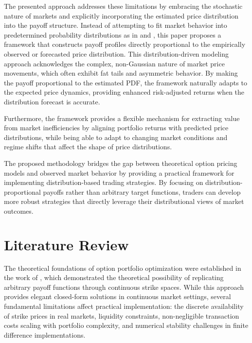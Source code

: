 \documentclass[12pt]{article}
\begin{document}
The presented approach addresses these limitations by embracing the stochastic nature of markets
and explicitly incorporating the estimated price distribution into the payoff structure. Instead 
of attempting to fit market behavior into predetermined probability distributions as in 
\citep{Kuang2023} and \citep{Li2023}, this paper proposes a framework that constructs payoff 
profiles directly proportional to the empirically observed or forecasted price distribution. 
This distribution-driven modeling approach acknowledges the complex, non-Gaussian nature of 
market price movements, which often exhibit fat tails and asymmetric behavior. By making the 
payoff proportional to the estimated PDF, the framework naturally adapts to the expected price 
dynamics, providing enhanced risk-adjusted returns when the distribution forecast is accurate.

Furthermore, the framework provides a flexible mechanism for extracting value from market
inefficiencies by aligning portfolio returns with predicted price distributions, while being 
able to adapt to changing market conditions and regime shifts that affect the shape of price
distributions.

The proposed methodology bridges the gap between theoretical option pricing models
and observed market behavior by providing a practical framework for implementing
distribution-based trading strategies. By focusing on distribution-proportional payoffs
rather than arbitrary target functions, traders can develop more robust strategies that
directly leverage their distributional views of market outcomes.

\section{Literature Review}
The theoretical foundations of option portfolio optimization were established in the work of 
\citep{Carr01012001}, which demonstrated the theoretical possibility of replicating 
arbitrary payoff functions through continuous strike spaces. While this approach 
provides elegant closed-form solutions in continuous market settings, several fundamental 
limitations affect practical implementation: the discrete availability of strike prices 
in real markets, liquidity constraints, non-negligible transaction costs scaling with 
portfolio complexity, and numerical stability challenges in finite difference implementations. 
\end{document}
